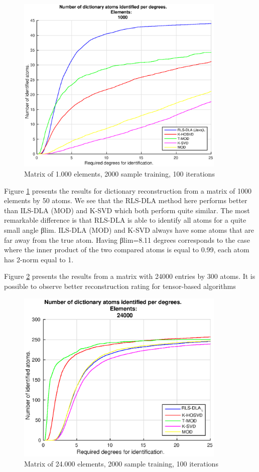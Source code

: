 \begin{figure}[!htb]
     \centering 
	 \includegraphics[width=10cm]{figures/5_20_2000_1000_100.eps}
     \caption{Matrix of 1.000 elements, 2000 sample training, 100 iterations}
     \label{fig:fig1}
\end{figure}

Figure \ref{fig:fig1} presents the results for dictionary reconstruction from a matrix of 1000 elements by 50 atoms. We see that the RLS-DLA method here performs better than ILS-DLA (MOD) and K-SVD which both perform quite similar. The most remarkable difference is that RLS-DLA is able to identify all atoms for a quite small angle βlim. ILS-DLA (MOD) and K-SVD always have some atoms that are far away from the true atom. Having βlim=8.11 degrees corresponds to the case where the inner product of the two compared atoms is equal to 0.99, each atom has 2-norm equal to 1.

Figure \ref{fig:fig2} presents the results from a matrix with 24000 entries by 300 atoms. It is possible to observe better reconstruction rating for tensor-based algorithms

\begin{figure}[!htb]
     \centering 
	 \includegraphics[width=10cm]{figures/5_20_2000_24000_100.eps}
     \caption{Matrix of 24.000 elements, 2000 sample training, 100 iterations}
     \label{fig:fig2}
\end{figure}

